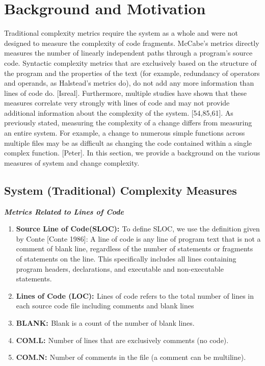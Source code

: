 \documentclass[9pt,twocolumn,a4paper]{article}
\begin{document}
\section{Background and Motivation}

Traditional complexity metrics require the system as a whole and were not designed to measure the complexity of code fragments. McCabe’s metrics directly measures the number of linearly independent paths through a program's source code. Syntactic complexity metrics that are exclusively based on the structure of the program and the properties of the text (for example, redundancy of operators and operands, as Halstead’s metrics do), do not add any more information than lines of code do. [Isreal]. Furthermore, multiple studies have shown that these measures correlate very strongly with lines of code and may not provide additional information about the complexity of the system. [54,85,61].
As previously stated, measuring the complexity of a change differs from measuring an entire system. For example, a change to numerous simple functions across multiple files may be as difficult as changing the code contained within a single complex function. [Peter].
In this section, we provide a background on the various measures of system and change complexity.


\subsection{System (Traditional) Complexity Measures}
{\bf{\emph{Metrics Related to Lines of Code}}}
\newline
\begin{enumerate}

\item{\bf{Source Line of Code(SLOC): }} To define SLOC, we use the definition given by Conte [Conte 1986]: A line of code is any line of program text that is not a comment of blank line, regardless of the number of statements or fragments of statements on the line. This specifically includes all lines containing program headers, declarations, and executable and non-executable statements.

\item{\bf{Lines of Code (LOC): }} Lines of code refers to the total number of lines in each source code file including comments and blank lines


\item{\bf{BLANK: }}Blank is a count of the number of blank lines.

\item{\bf{COM.L: }}Number of lines that are exclusively comments (no code).

\item{\bf{COM.N: }} Number of comments in the file (a comment can be multiline).
\end{enumerate}
\end{document}

